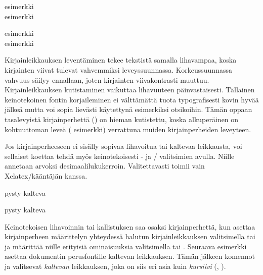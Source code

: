 \begin{koodilohkosis}
esimerkki \\
{ esimerkki}
\end{koodilohkosis}

\begin{tulossis}
  esimerkki \\
  { esimerkki}
\end{tulossis}

\noindent
Kirjainleikkauksen leventäminen tekee tekstistä samalla lihavampaa,
koska kirjainten viivat tulevat vahvemmiksi leveyssuunnassa.
Korkeussuunnassa vahvuus säilyy ennallaan, joten kirjainten
viivakontrasti muuttuu. Kirjainleikkauksen kutistaminen vaikuttaa
lihavuuteen päinvastaisesti. Tällainen keinotekoinen fontin
korjaileminen ei välttämättä tuota typografisesti kovin hyvää jälkeä
mutta voi sopia lievästi käytettynä esimerkiksi otsikoihin. Tämän oppaan
tasalevyistä kirjainperhettä () on hieman
kutistettu, koska alkuperäinen on kohtuuttoman leveä
({\ttfamily{} esimerkki}) verrattuna muiden
kirjainperheiden leveyteen.

Jos kirjainperheeseen ei sisälly sopivaa lihavoitua tai kaltevaa
leikkausta, voi sellaiset koettaa tehdä myös keinotekoisesti
- ja \-/ valitsimien avulla.
Niille annetaan arvoksi desimaalilukukerroin. Valitettavasti
 toimii vain Xelatex\-/kääntäjän kanssa.

\begin{koodilohkosis}
pysty { kalteva}
\end{koodilohkosis}

\begin{tulossis}
  pysty { kalteva}
\end{tulossis}

\noindent
Keinotekoisen lihavoinnin tai kallistuksen saa osaksi kirjainperhettä,
kun asettaa kirjainperheen määrittelyn yhteydessä halutun
kirjainleikkauksen valitsimella  tai
 ja määrittää niille erityisiä ominaisuuksia
valitsimella  tai .
Seuraava esimerkki asettaa dokumentin perusfontille kaltevan
leikkauksen. Tämän jälkeen komennot  ja
 valitsevat \textsl{kaltevan} leikkauksen, joka on siis
eri asia kuin \textit{kursiivi} (, ).

